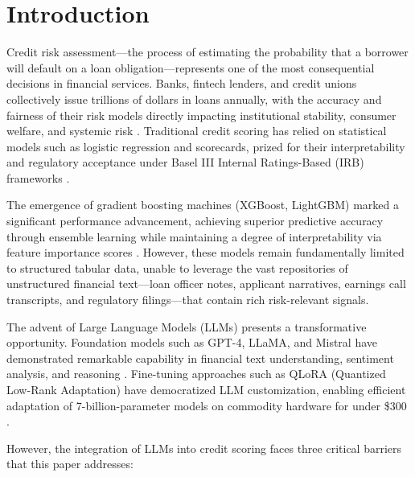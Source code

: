 \documentclass[11pt,a4paper]{article}
\begin{document}
\section{Introduction}\label{sec:introduction}

Credit risk assessment---the process of estimating the probability that a borrower will default on a loan obligation---represents one of the most consequential decisions in financial services. Banks, fintech lenders, and credit unions collectively issue trillions of dollars in loans annually, with the accuracy and fairness of their risk models directly impacting institutional stability, consumer welfare, and systemic risk \citep{basel2023}. Traditional credit scoring has relied on statistical models such as logistic regression and scorecards, prized for their interpretability and regulatory acceptance under Basel III Internal Ratings-Based (IRB) frameworks \citep{basel2006}.

The emergence of gradient boosting machines (XGBoost, LightGBM) marked a significant performance advancement, achieving superior predictive accuracy through ensemble learning while maintaining a degree of interpretability via feature importance scores \citep{chen2016xgboost, ke2017lightgbm}. However, these models remain fundamentally limited to structured tabular data, unable to leverage the vast repositories of unstructured financial text---loan officer notes, applicant narratives, earnings call transcripts, and regulatory filings---that contain rich risk-relevant signals.

The advent of Large Language Models (LLMs) presents a transformative opportunity. Foundation models such as GPT-4, LLaMA, and Mistral have demonstrated remarkable capability in financial text understanding, sentiment analysis, and reasoning \citep{yang2023fingpt, wu2023bloomberggpt}. Fine-tuning approaches such as QLoRA (Quantized Low-Rank Adaptation) have democratized LLM customization, enabling efficient adaptation of 7-billion-parameter models on commodity hardware for under \$300 \citep{dettmers2023qlora}.

However, the integration of LLMs into credit scoring faces three critical barriers that this paper addresses:
\end{document}
